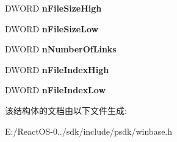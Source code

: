 \begin{DoxyCompactItemize}
\mbox{\label{struct___b_y___h_a_n_d_l_e___f_i_l_e___i_n_f_o_r_m_a_t_i_o_n_a2ba5401a39a963153c2733b3a02d184a}} 
D\+W\+O\+RD {\bfseries n\+File\+Size\+High}
\item 
\mbox{\label{struct___b_y___h_a_n_d_l_e___f_i_l_e___i_n_f_o_r_m_a_t_i_o_n_a09ae8307b8134e834865684871fc6e12}} 
D\+W\+O\+RD {\bfseries n\+File\+Size\+Low}
\item 
\mbox{\label{struct___b_y___h_a_n_d_l_e___f_i_l_e___i_n_f_o_r_m_a_t_i_o_n_a3142f8b35d1bd288cc9186104ceba8a6}} 
D\+W\+O\+RD {\bfseries n\+Number\+Of\+Links}
\item 
\mbox{\label{struct___b_y___h_a_n_d_l_e___f_i_l_e___i_n_f_o_r_m_a_t_i_o_n_ab0f4298ff86255bbf7f02a34208a10fb}} 
D\+W\+O\+RD {\bfseries n\+File\+Index\+High}
\item 
\mbox{\label{struct___b_y___h_a_n_d_l_e___f_i_l_e___i_n_f_o_r_m_a_t_i_o_n_a42d9400cade43fabcac4abb94bdce816}} 
D\+W\+O\+RD {\bfseries n\+File\+Index\+Low}
\end{DoxyCompactItemize}


该结构体的文档由以下文件生成\+:\begin{DoxyCompactItemize}
\item 
E\+:/\+React\+O\+S-\/0../sdk/include/psdk/winbase.\+h\end{DoxyCompactItemize}
